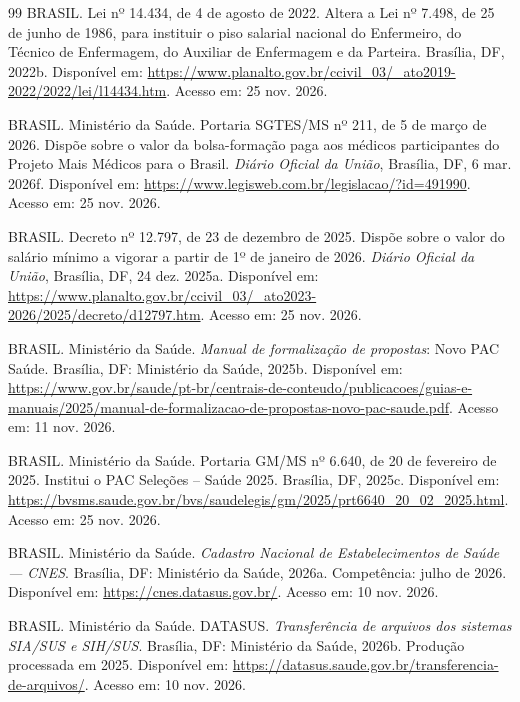 \documentclass[12pt,a4paper,oneside]{report}
\begin{document}
\begin{thebibliography}{99}
BRASIL. Lei nº 14.434, de 4 de agosto de 2022. Altera a Lei nº 7.498, de 25 de junho de 1986, para instituir o piso salarial nacional do Enfermeiro, do Técnico de Enfermagem, do Auxiliar de Enfermagem e da Parteira. Brasília, DF, 2022b. Disponível em: \url{https://www.planalto.gov.br/ccivil_03/_ato2019-2022/2022/lei/l14434.htm}. Acesso em: 25 nov. 2026.

BRASIL. Ministério da Saúde. Portaria SGTES/MS nº 211, de 5 de março de 2026. Dispõe sobre o valor da bolsa-formação paga aos médicos participantes do Projeto Mais Médicos para o Brasil. \textit{Diário Oficial da União}, Brasília, DF, 6 mar. 2026f. Disponível em: \url{https://www.legisweb.com.br/legislacao/?id=491990}. Acesso em: 25 nov. 2026.

BRASIL. Decreto nº 12.797, de 23 de dezembro de 2025. Dispõe sobre o valor do salário mínimo a vigorar a partir de 1º de janeiro de 2026. \textit{Diário Oficial da União}, Brasília, DF, 24 dez. 2025a. Disponível em: \url{https://www.planalto.gov.br/ccivil_03/_ato2023-2026/2025/decreto/d12797.htm}. Acesso em: 25 nov. 2026.

BRASIL. Ministério da Saúde. \textit{Manual de formalização de propostas}: Novo PAC Saúde. Brasília, DF: Ministério da Saúde, 2025b. Disponível em: \url{https://www.gov.br/saude/pt-br/centrais-de-conteudo/publicacoes/guias-e-manuais/2025/manual-de-formalizacao-de-propostas-novo-pac-saude.pdf}. Acesso em: 11 nov. 2026.

BRASIL. Ministério da Saúde. Portaria GM/MS nº 6.640, de 20 de fevereiro de 2025. Institui o PAC Seleções -- Saúde 2025. Brasília, DF, 2025c. Disponível em: \url{https://bvsms.saude.gov.br/bvs/saudelegis/gm/2025/prt6640_20_02_2025.html}. Acesso em: 25 nov. 2026.

BRASIL. Ministério da Saúde. \textit{Cadastro Nacional de Estabelecimentos de Saúde --- CNES}. Brasília, DF: Ministério da Saúde, 2026a. Competência: julho de 2026. Disponível em: \url{https://cnes.datasus.gov.br/}. Acesso em: 10 nov. 2026.

BRASIL. Ministério da Saúde. DATASUS. \textit{Transferência de arquivos dos sistemas SIA/SUS e SIH/SUS}. Brasília, DF: Ministério da Saúde, 2026b. Produção processada em 2025. Disponível em: \url{https://datasus.saude.gov.br/transferencia-de-arquivos/}. Acesso em: 10 nov. 2026.


\end{thebibliography}
\end{document}
